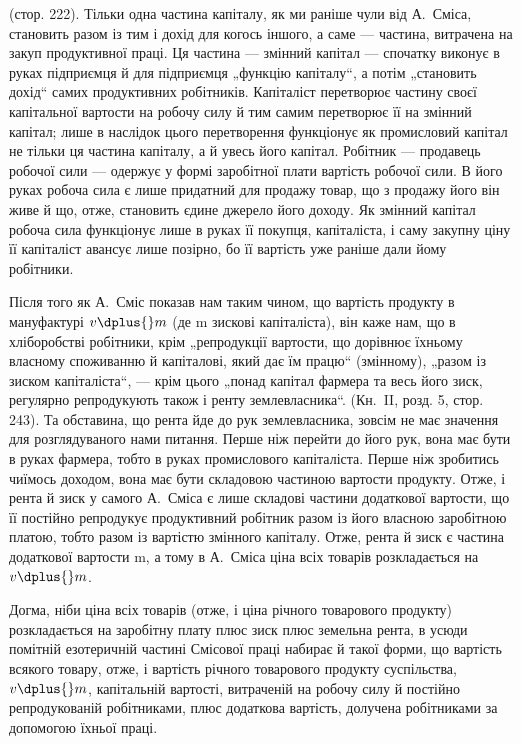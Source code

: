 \parcont{}  %
 (стор. 222). Тільки одна частина капіталу, як ми
раніше чули від А.~Сміса, становить разом із тим і дохід для когось
іншого, а саме — частина, витрачена на закуп продуктивної праці. Ця частина
— змінний капітал — спочатку виконує в руках підприємця й для підприємця
„функцію капіталу“, а потім „становить дохід“ самих продуктивних
робітників. Капіталіст перетворює частину своєї капітальної вартости на
робочу силу й тим самим перетворює її на змінний капітал; лише в наслідок
цього перетворення функціонує як промисловий капітал не тільки ця частина
капіталу, а й увесь його капітал. Робітник — продавець робочої сили — одержує
у формі заробітної плати вартість робочої сили. В його руках робоча
сила є лише придатний для продажу товар, що з продажу його він живе
й що, отже, становить єдине джерело його доходу. Як змінний капітал
робоча сила функціонує лише в руках її покупця, капіталіста, і саму
закупну ціну її капіталіст авансує лише позірно, бо її вартість уже раніше
дали йому робітники.

Після того як А.~Сміс показав нам таким чином, що вартість продукту
в мануфактурі \deq{} $v \dplus{} m$ (де m \deq{} зискові капіталіста), він каже нам,
що в хліборобстві робітники, крім „репродукції вартости, що дорівнює
їхньому власному споживанню й капіталові, який дає їм працю“ (змінному),
„разом із зиском капіталіста“, — крім цього „понад капітал фармера
та весь його зиск, регулярно репродукують також і ренту землевласника“.
(Кн.~II, розд. 5, стор. 243). Та обставина, що рента
йде до рук землевласника, зовсім не має значення для розглядуваного
нами питання. Перше ніж перейти до його рук, вона має бути в
руках фармера, тобто в руках промислового капіталіста. Перше ніж зробитись
чиїмось доходом, вона має бути складовою частиною вартости
продукту. Отже, і рента й зиск у самого А.~Сміса є лише складові частини
додаткової вартости, що її постійно репродукує продуктивний робітник
разом із його власною заробітною платою, тобто разом із вартістю
змінного капіталу. Отже, рента й зиск є частина додаткової вартости
m, а тому в А.~Сміса ціна всіх товарів розкладається на $v \dplus{} m$.

Догма, ніби ціна всіх товарів (отже, і ціна річного товарового продукту)
розкладається на заробітну плату плюс зиск плюс земельна рента, в
усюди помітній езотеричній частині Смісової праці набирає й такої форми,
що вартість всякого товару, отже, і вартість річного товарового продукту
суспільства, \deq{} $v \dplus{} m$, \deq{} капітальній вартості, витраченій на робочу силу
й постійно репродукованій робітниками, плюс додаткова вартість, долучена
робітниками за допомогою їхньої праці.

